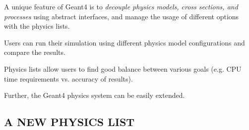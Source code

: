 \documentclass[20pt]{article}
\newenvironment{textbox}
{\begin{lrbox}{\dummybox}\begin{minipage}{0.9\columnwidth}}
{\end{minipage}\end{lrbox}\raisebox{-\depth}{\psshadowbox[framesep=1em,framearc=.1,shadow=true]{\usebox{\dummybox}}}\vspace{0.005\textheight}}
\begin{document}
\begin{center}
\begin{multicols}{3}
\begin{textbox}
A unique feature of {\sf Geant4} is to  
\emph{decouple physics models, cross sections, and processes}
using abstract interfaces, and manage the usage of different options with the physics lists.


\begin{itemize}
\item Users can run their simulation using different physics model
configurations and compare the results.
{\color{udsect}
\item Physics lists allow users to find good balance between various goals (e.g. CPU
time requirements vs. accuracy of results).
}

\item Further, the {\sf Geant4} physics system can be easily extended.
\end{itemize}

\end{textbox}


\vspace{0.4cm}
\begin{textbox}

\section*{{\Huge {\sf  A NEW PHYSICS LIST}}}


\end{textbox}
\end{multicols}
\end{center}
\end{document}
